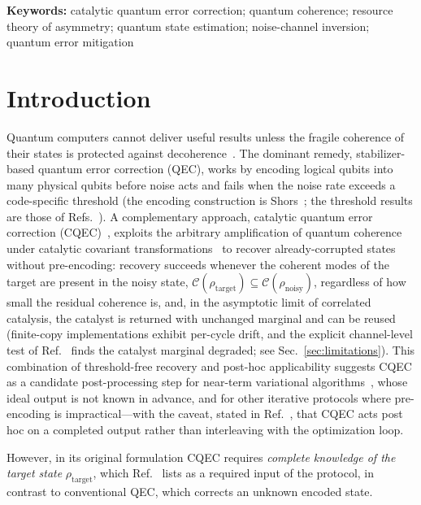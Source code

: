 \documentclass[12pt,a4paper]{article}
\newcommand{\CC}{\mathcal{C}}
\newcommand{\rhot}{\rho_\mathrm{target}}
\newcommand{\rhon}{\rho_\mathrm{noisy}}
\begin{document}
\noindent\textbf{Keywords:} catalytic quantum error correction; quantum coherence; resource theory of asymmetry; quantum state estimation; noise-channel inversion; quantum error mitigation


 
\section{Introduction}
\label{sec:introduction}

Quantum computers cannot deliver useful results unless the fragile coherence of their states is protected against decoherence~\cite{NielsenChuang2010}.
The dominant remedy, stabilizer-based quantum error correction (QEC), works by encoding logical qubits into many physical qubits before noise acts and fails when the noise rate exceeds a code-specific threshold (the encoding construction is Shor\textquotesingle s~\cite{Shor1995}; the threshold results are those of Refs.~\cite{Gottesman1997,Knill2005}).
A complementary approach, catalytic quantum error correction (CQEC)~\cite{Wakaura2026unified}, exploits the arbitrary amplification of quantum coherence under catalytic covariant transformations~\cite{Shiraishi2024} to recover already-corrupted states without pre-encoding: recovery succeeds whenever the coherent modes of the target are present in the noisy state, $\CC(\rhot) \subseteq \CC(\rhon)$, regardless of how small the residual coherence is, and, in the asymptotic limit of correlated catalysis, the catalyst is returned with unchanged marginal and can be reused~\cite{Shiraishi2024,Wakaura2026unified} (finite-copy implementations exhibit per-cycle drift, and the explicit channel-level test of Ref.~\cite{Wakaura2026unified} finds the catalyst marginal degraded; see Sec.~\ref{sec:limitations}).
This combination of threshold-free recovery and post-hoc applicability suggests CQEC as a candidate post-processing step for near-term variational algorithms~\cite{Peruzzo2014,Cerezo2021}, whose ideal output is not known in advance, and for other iterative protocols where pre-encoding is impractical---with the caveat, stated in Ref.~\cite{Wakaura2026unified}, that CQEC acts post hoc on a completed output rather than interleaving with the optimization loop.

However, in its original formulation CQEC requires \emph{complete knowledge of the target state} $\rhot$, which Ref.~\cite{Wakaura2026unified} lists as a required input of the protocol, in contrast to conventional QEC, which corrects an unknown encoded state.
\end{document}

